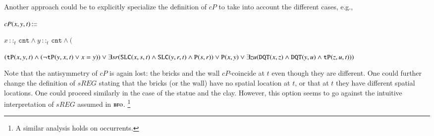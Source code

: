 \documentclass[ao]{iosart2x}
\newcommand{\nb}[1]{\textcolor{red}{$|$}\marginpar{\hspace*{-0cm}\parbox{20mm}{\scriptsize\raggedright\textcolor{red}{#1}}}}
\newcommand{\bflist}{\begin{list}{}{\setlength{\topsep}{2mm}\setlength{\parsep}{0mm}\setlength{\leftmargin}{9.2mm}\setlength{\labelwidth}{8mm}}}
\newcommand{\eflist}{\end{list}}
\newcommand{\dbThrLabel}{\textrm{t$_\texttt{db}$}}
\newcommand{\refdbth}[1]{({\dbThrLabel}\ref{#1})}
\newcommand{\pr}[1]{\mathtt{#1}}
\newcommand{\prbfo}[1]{{\textit{{#1}}}}
\newcommand{\cn}[1]{\mathtt{#1}}
\newcommand\textequal{%
 \rule[.08ex]{5pt}{0.35pt}\llap{\rule[.78ex]{5pt}{0.35pt}}}
\newcommand{\sdef}{{\hspace{1.5pt}:\hspace{-2.5pt}\textequal\hspace{3pt}}}
\newcommand{\bfo}{{\textsc{bfo}}}
\newcommand {\TPd} {\ensuremath{\pr{tP}}}
\newcommand {\Pd} {\ensuremath{\pr{P}}}
\newcommand {\DQTd} {\ensuremath{\pr{DQT}}}
\newcommand {\SLCd} {\ensuremath{\pr{SLC}}}
\newcommand{\cntbcat}{\cn{cnt}}
\newcommand{\bfocpart}{\prbfo{cP}}
\newcommand{\bfoiof}[1]{{\,::_{#1\:\!}}}
\newcommand{\bfosregof}{\prbfo{sREG}}
\begin{document}
Another approach could be to explicitly specialize the definition of $\bfocpart$ to take into account the different cases, e.g.,  
\bflist
\item[] $\bfocpart(x,y,t) \sdef $\parbox[t]{\textwidth} {$x \bfoiof{t} \cntbcat \land y \bfoiof{t} \cntbcat \land 
($\parbox[t]{\textwidth} {$(\TPd(x,y,t) \land (\neg \TPd(y,x,t) \lor x=y)) \lor \\ 
\exists sr(\SLCd(x,s,t) \land \SLCd(y,r,t) \land \Pd(s,r)) \lor \\ 
\Pd(x,y) \lor \exists zu(\DQTd(x,z) \land \DQTd(y,u) \land \TPd(z,u,t)))$}}
\eflist
Note that the antisymmetry of $\bfocpart$ is again lost: the bricks and the wall $\bfocpart$-coincide at $t$ even though they are different. One could further change the definition of $\bfosregof$ stating that the bricks (or the wall) have no spatial location at $t$, or that at $t$ they have different spatial locations. One could proceed similarly in the case of the statue and the clay. However, this option seems to go against the intuitive interpretation of $\bfosregof$ assumed in $\bfo$.%
\footnote{A similar analysis holds on occurrents.}%
\end{document}
